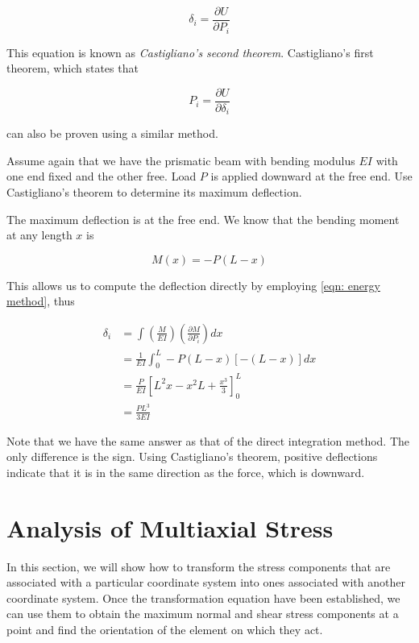 \documentclass[
10pt,
a4paper,
openany,
svgnames,
]{book}
\begin{document}
\begin{equation} \label{eqn: energy method}
  \delta_i = \frac{\partial U}{\partial P_i}
\end{equation}

This equation is known as \emph{Castigliano’s second theorem}.
Castigliano’s first theorem, which states that

\begin{equation}
P_i = \frac{\partial U}{\partial \delta_i}
\end{equation}

can also be proven using a similar method.

\begin{example}
Assume again that we have the prismatic beam with bending modulus $EI$ with one end fixed and the other free. Load $P$ is applied downward at the free end. Use Castigliano’s theorem to determine its maximum deflection.
\end{example}
\begin{solution}
The maximum deflection is at the free end. We know that the bending moment at any length $x$ is

\[M(x) =  - P(L - x)\]

This allows us to compute the deflection directly by employing \cref{eqn: energy method}, thus

\begin{align*}
  \delta_i &= \int \left( \frac{M}{EI} \right) \left( \frac{\partial M}{\partial P_i} \right)dx \\ 
              &= \frac{1}{EI}\int_0^L  - P(L - x)[ - (L - x)]dx  \\ 
              &= \frac{P}{EI}\left[ L^2x - x^2L + \frac{x^3}{3} \right]_0^L \\ 
              &= \frac{PL^3}{3EI} 
\end{align*}	

Note that we have the same answer as that of the direct integration method. The only difference is the sign. Using Castigliano's theorem, positive deflections indicate that it is in the same direction as the force, which is downward.
\end{solution}

\section{Analysis of Multiaxial Stress} \label{section: multiaxial stress}

In this section, we will show how to transform the stress components that are associated with a particular coordinate system into ones associated with another coordinate system. Once the transformation equation have been established, we can use them to obtain the maximum normal and shear stress components at a point and find the orientation of the element on which they act.
\end{document}
